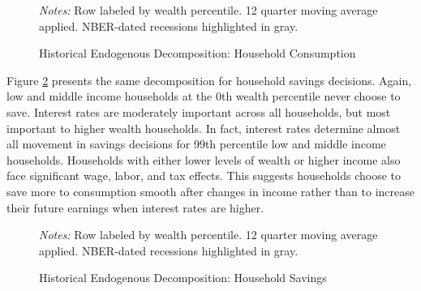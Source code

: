 \begin{figure}[t!]
    \centering
    \caption{Historical Endogenous Decomposition: Household Consumption}
    

    {\scriptsize \emph{Notes:} Row labeled by wealth percentile. 12 quarter moving average applied. NBER-dated recessions highlighted in gray.}
    \label{fig:cons-endog-hist-decomp}
\end{figure}

Figure \ref{fig:sav-endog-hist-decomp} presents the same decomposition for household savings decisions. Again, low and middle income households at the 0th wealth percentile never choose to save. Interest rates are moderately important across all households, but most important to higher wealth households. In fact, interest rates determine almost all movement in savings decisions for 99th percentile low and middle income households. Households with either lower levels of wealth or higher income also face significant wage, labor, and tax effects. This suggests households choose to save more to consumption smooth after changes in income rather than to increase their future earnings when interest rates are higher.

\begin{figure}[t!]
    \centering
    \caption{Historical Endogenous Decomposition: Household Savings}
    

    {\scriptsize \emph{Notes:} Row labeled by wealth percentile. 12 quarter moving average applied. NBER-dated recessions highlighted in gray.}
    \label{fig:sav-endog-hist-decomp}
\end{figure}
